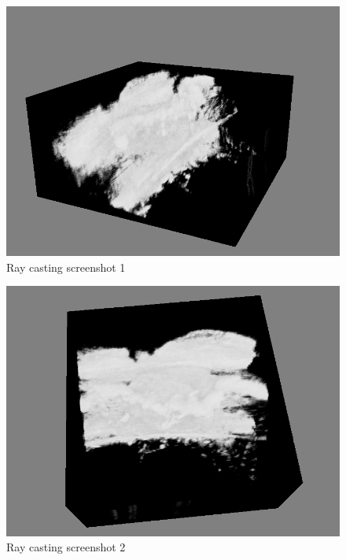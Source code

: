 \begin{figure}[h]
\centering
\includegraphics[height=0.45\textheight]{graphics/raycast_screen0.png}
\caption{Ray casting screenshot 1}
\label{fig:large_raycast_screen0}
\end{figure}

\begin{figure}[h]
\centering
\includegraphics[height=0.45\textheight]{graphics/raycast_screen1.png}
\caption{Ray casting screenshot 2}
\label{fig:large_raycast_screen1}
\end{figure}


